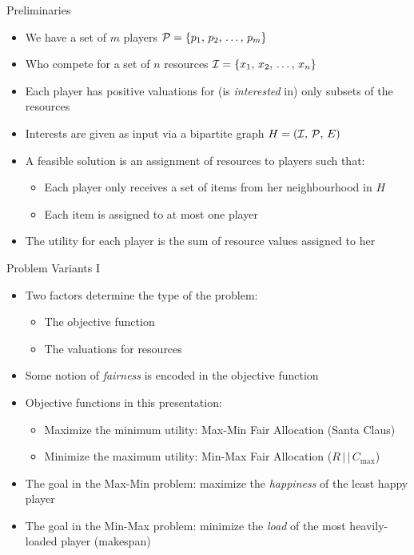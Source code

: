 \documentclass[10pt]{beamer}
\begin{document}
\begin{frame}{Preliminaries}
	\begin{itemize}
    	\item<1-> We have a set of $m$ players $\mathcal{P} = \{p_1, \, p_2, \, \ldots, \, p_m  \}$
        \item<2-> Who compete for a set of $n$ resources $\mathcal{I} = \{x_1, \, x_2, \, \ldots, \, x_n \}$
        \item<3-> Each player has positive valuations for (is \emph{interested} in) only subsets of the resources
        \item<4-> Interests are given as input via a bipartite graph $H = (\mathcal{I}, \, \mathcal{P}, \, E)$
        \item<5-> A \alert{feasible} solution is an assignment of resources to players such that:
        \begin{itemize}
         	\item<6-> Each player only receives a set of items from her neighbourhood in $H$
            \item<7-> Each item is assigned to at most one player
        \end{itemize}
        \item<8-> The utility for each player is the sum of resource values assigned to her
    \end{itemize}
\end{frame}

\begin{frame}{Problem Variants I}
	\begin{itemize}
    	\item<1-> Two factors determine the type of the problem:
        	\begin{itemize}
            	\item<2-> The objective function
                \item<3-> The valuations for resources
            \end{itemize}
        \item<4-> Some notion of \emph{fairness} is encoded in the objective function    
		\item<5-> Objective functions in this presentation:
        	\begin{itemize}
            	\item<6-> Maximize the minimum utility: \alert{Max-Min Fair Allocation} (\alert{Santa Claus})
                \item<7-> Minimize the maximum utility: \alert{Min-Max Fair Allocation} (\alert{$R \, | \, | \, C_{\max}$}) 
            \end{itemize}   
        \item<8-> The goal in the Max-Min problem: maximize the \emph{happiness} of the least happy player
        \item<9-> The goal in the Min-Max problem: minimize the \emph{load} of the most heavily-loaded player (makespan)
    \end{itemize}
\end{frame}
\end{document}
